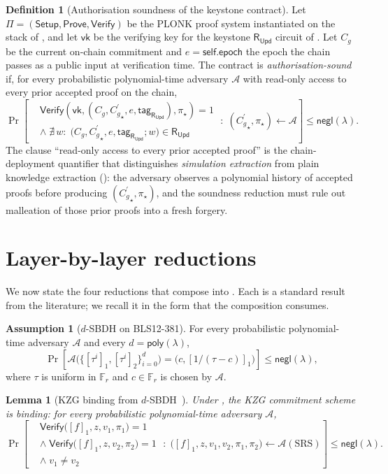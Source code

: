 \documentclass[11pt,a4paper]{article}
\theoremstyle{plain}
\newtheorem{lemma}{Lemma}
\theoremstyle{definition}
\newtheorem{definition}{Definition}
\newtheorem{assumption}{Assumption}
\newcommand{\Fr}{\mathbb{F}_r}
\newcommand{\Cg}{C_g}
\newcommand{\Cgp}{{C_g^{\prime}}}
\newcommand{\RUpd}{\mathsf{R}_{\mathsf{Upd}}}
\newcommand{\negl}{\mathsf{negl}}
\newcommand{\Adv}{\mathcal{A}}
\newcommand{\Setup}{\mathsf{Setup}}
\newcommand{\Prove}{\mathsf{Prove}}
\newcommand{\Verify}{\mathsf{Verify}}
\begin{document}
\begin{definition}[Authorisation soundness of the keystone contract]
\label{def:auth}
Let $\Pi = (\Setup, \Prove, \Verify)$ be the PLONK proof system
instantiated on the stack of , and let
$\mathsf{vk}$ be the verifying key for the keystone $\RUpd$
circuit of . Let $\Cg$ be the current on-chain commitment and $e =
\mathsf{self.epoch}$ the epoch the chain passes as a public input
at verification time. The contract is \emph{authorisation-sound}
if, for every probabilistic polynomial-time adversary $\Adv$ with
read-only access to every prior accepted proof on the chain,
\[
\Pr\!\left[
\begin{aligned}
&\Verify(\mathsf{vk}, (\Cg, \Cgp_{\star}, e, \mathsf{tag}_{\RUpd}), \pi_{\star}) = 1 \\
&\wedge\; \nexists\, w :\; \bigl(\Cg, \Cgp_{\star}, e, \mathsf{tag}_{\RUpd}; w\bigr) \in \RUpd
\end{aligned}
\;:\; (\Cgp_{\star}, \pi_{\star}) \leftarrow \Adv
\right] \le \negl(\lambda).
\]
The clause ``read-only access to every prior accepted proof'' is
the chain-deployment quantifier that distinguishes \emph{simulation
extraction} from plain knowledge extraction ():
the adversary observes a polynomial history of accepted proofs
before producing $(\Cgp_{\star}, \pi_{\star})$, and the
soundness reduction must rule out malleation of those prior
proofs into a fresh forgery.
\end{definition}

\section{Layer-by-layer reductions}
\label{sec:reductions}

We now state the four reductions that compose into
. Each is a standard result from the literature;
we recall it in the form that the composition consumes.

\begin{assumption}[$d$-SBDH on BLS12-381]
\label{ass:sbdh}
For every probabilistic polynomial-time adversary $\Adv$ and
every $d = \mathsf{poly}(\lambda)$,
\[
\Pr\!\left[ \Adv\bigl(\{[\tau^i]_1, [\tau^i]_2\}_{i=0}^{d}\bigr)
            = \bigl(c, [1/(\tau - c)]_1\bigr) \right]
\le \negl(\lambda),
\]
where $\tau$ is uniform in $\Fr$ and $c \in \Fr$ is chosen by $\Adv$.
\end{assumption}

\begin{lemma}[KZG binding from $d$-SBDH~\cite{kate-2010-kzg}]
\label{lem:kzg}
Under , the KZG commitment scheme is binding:
for every probabilistic polynomial-time adversary $\Adv$,
\[
\Pr\!\left[
\begin{aligned}
&\Verify\bigl([f]_1, z, v_1, \pi_1\bigr) = 1 \\
&\wedge\; \Verify\bigl([f]_1, z, v_2, \pi_2\bigr) = 1 \\
&\wedge\; v_1 \ne v_2
\end{aligned}
\;:\; \bigl([f]_1, z, v_1, v_2, \pi_1, \pi_2\bigr) \leftarrow \Adv(\mathrm{SRS})
\right] \le \negl(\lambda).
\]
\end{lemma}
\end{document}
